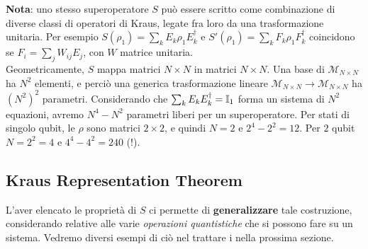 \documentclass[../../InformazioneQuantistica.tex]{subfiles}
\begin{document}
\textbf{Nota}: uno stesso superoperatore $S$ può essere scritto come combinazione di diverse classi di operatori di Kraus, legate fra loro da una trasformazione unitaria. Per esempio $S(\rho_1)= \sum_k E_k \rho_1 E_k^\dag$ e $S'(\rho_1)= \sum_k F_k \rho_1 F_k^\dag$ coincidono se $F_i = \sum_j W_{ij}E_j$, con $W$ matrice unitaria.\\
Geometricamente, $S$ mappa matrici $N\times N$ in matrici $N\times N$. Una base di $\mathcal{M}_{N\times N}$ ha $N^2$ elementi, e perciò una generica trasformazione lineare $\mathcal{M}_{N\times N}\to\mathcal{M}_{N\times N}$ ha $(N^2)^2$ parametri. Considerando che $\sum_k E_k E_k^\dag = \mathbb{I}_1$ forma un sistema di $N^2$ equazioni, avremo $N^4-N^2$ parametri liberi per un superoperatore. Per stati di singolo qubit, le $\rho$ sono matrici $2\times 2$, e quindi $N=2$ e $2^4-2^2=12$. Per $2$ qubit $N=2^2 = 4$ e $4^4-4^2=240$ (!). 
\subsection{Kraus Representation Theorem}
L'aver elencato le proprietà di $S$ ci permette di \textbf{generalizzare} tale costruzione, considerando  relative alle varie \textit{operazioni quantistiche} che si possono fare su un sistema. Vedremo diversi esempi di ciò nel trattare i  nella prossima sezione.\\
\end{document}
